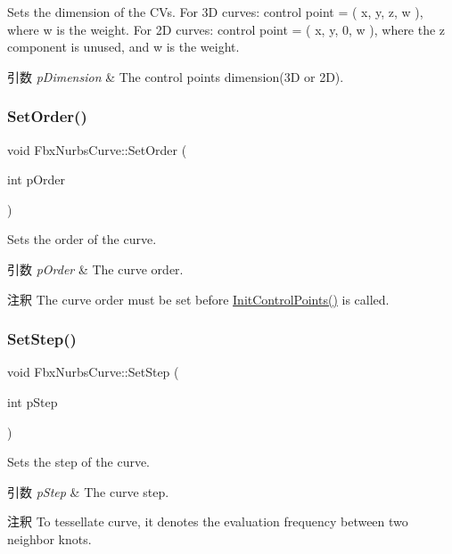 Sets the dimension of the C\+Vs. For 3D curves\+: control point = ( x, y, z, w ), where w is the weight. For 2D curves\+: control point = ( x, y, 0, w ), where the z component is unused, and w is the weight. 
\begin{DoxyParams}{引数}
{\em p\+Dimension} & The control points dimension(3\+D or 2\+D). \\
\hline
\end{DoxyParams}
\mbox{\label{class_fbx_nurbs_curve_a86494a5ca4d88af6700d0d1345852736}} 
\subsubsection{\texorpdfstring{Set\+Order()}{SetOrder()}}
{\footnotesize\ttfamily void Fbx\+Nurbs\+Curve\+::\+Set\+Order (\begin{DoxyParamCaption}\item[{int}]{p\+Order }\end{DoxyParamCaption})}

Sets the order of the curve. 
\begin{DoxyParams}{引数}
{\em p\+Order} & The curve order. \\
\hline
\end{DoxyParams}
\begin{DoxyRemark}{注釈}
The curve order must be set before \hyperlink{class_fbx_nurbs_curve_ac89cc4d5bf1bef1d88ee1b6e4b18be9b}{Init\+Control\+Points()} is called. 
\end{DoxyRemark}
\mbox{\label{class_fbx_nurbs_curve_ab789815bcd27978f3a4cf57bb494c7f7}} 
\subsubsection{\texorpdfstring{Set\+Step()}{SetStep()}}
{\footnotesize\ttfamily void Fbx\+Nurbs\+Curve\+::\+Set\+Step (\begin{DoxyParamCaption}\item[{int}]{p\+Step }\end{DoxyParamCaption})}

Sets the step of the curve. 
\begin{DoxyParams}{引数}
{\em p\+Step} & The curve step. \\
\hline
\end{DoxyParams}
\begin{DoxyRemark}{注釈}
To tessellate curve, it denotes the evaluation frequency between two neighbor knots. 
\end{DoxyRemark}
\mbox{\label{class_fbx_nurbs_curve_a5e31ed3aff19c0fb28dd18492d044fe8}} 
